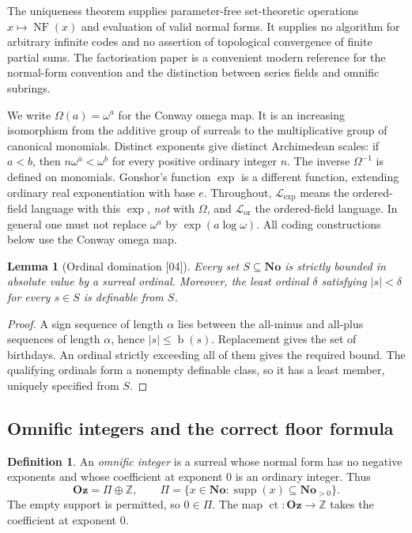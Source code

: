 \documentclass[11pt,a4paper]{article}
\numberwithin{equation}{section}
\newtheorem{lemma}[lemma]{Lemma}
\theoremstyle{definition}
\newtheorem{definition}[definition]{Definition}
\theoremstyle{remark}
\newcommand{\No}{\mathbf{No}}
\newcommand{\Oz}{\mathbf{Oz}}
\newcommand{\Z}{\mathbb Z}
\newcommand{\bd}{\operatorname{b}}
\newcommand{\ct}{\operatorname{ct}}
\newcommand{\supp}{\operatorname{supp}}
\newcommand{\NF}{\operatorname{NF}}
\newcommand{\Lexp}{\mathcal L_{\exp}}
\newcommand{\Lor}{\mathcal L_{\mathrm{or}}}
\newcommand{\src}[1]{\textup{\textsf{\small[#1]}}}
\begin{document}
The uniqueness theorem supplies parameter-free set-theoretic operations
$x\mapsto\NF(x)$ and evaluation of valid normal forms. It supplies no
algorithm for arbitrary infinite codes and no assertion of topological
convergence of finite partial sums. The factorisation paper
\cite[Sections 1--2]{LM} is a convenient modern reference for the
normal-form convention and the distinction between series fields and
omnific subrings.

We write $\Omega(a)=\omega^a$ for the Conway omega map. It is an
increasing isomorphism from the additive group of surreals to the
multiplicative group of canonical monomials. Distinct exponents give
distinct Archimedean scales: if $a<b$, then $n\omega^a<\omega^b$ for every
positive ordinary integer $n$. The inverse $\Omega^{-1}$ is defined on
monomials. Gonshor's function $\exp$ is a different function, extending
ordinary real exponentiation with base $e$. Throughout, $\Lexp$ means the
ordered-field language with this $\exp$, \emph{not} with $\Omega$, and
$\Lor$ the ordered-field language. In general one must not replace
$\omega^a$ by $\exp(a\log\omega)$. All coding constructions below use the
Conway omega map.

\begin{lemma}[Ordinal domination \src{04}]\label{dsn:lem:ordinalbound}
Every set $S\subseteq\No$ is strictly bounded in absolute value by a
surreal ordinal. Moreover, the least ordinal $\delta$ satisfying
$|s|<\delta$ for every $s\in S$ is definable from $S$.
\end{lemma}
\begin{proof}
A sign sequence of length $\alpha$ lies between the all-minus and
all-plus sequences of length $\alpha$, hence $|s|\leq\bd(s)$.
Replacement gives the set of birthdays. An ordinal strictly exceeding
all of them gives the required bound. The qualifying ordinals form a
nonempty definable class, so it has a least member, uniquely specified
from $S$.
\end{proof}

\subsection{Omnific integers and the correct floor formula}

\begin{definition}\label{dsn:def:Oz}
An \emph{omnific integer} is a surreal whose normal form has no negative
exponents and whose coefficient at exponent $0$ is an ordinary integer.
Thus
\begin{equation}\label{dsn:eq:Oz}
 \Oz=\Pi\oplus\Z,\qquad
 \Pi=\{x\in\No:\supp(x)\subseteq\No_{>0}\}.
\end{equation}
The empty support is permitted, so $0\in\Pi$. The map
$\ct:\Oz\to\Z$ takes the coefficient at exponent $0$.
\end{definition}
\end{document}
